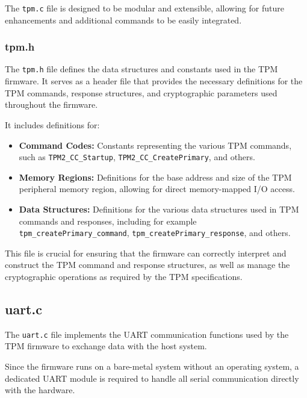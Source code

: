 The \texttt{tpm.c} file is designed to be modular and
extensible, allowing for future enhancements and
additional commands to be easily integrated.

\subsubsection{tpm.h}
The \texttt{tpm.h} file defines the data structures and
constants used in the TPM firmware. It serves as a
header file that provides the necessary definitions
for the TPM commands, response structures, and
cryptographic parameters used throughout the firmware.

It includes definitions for:
\begin{itemize}
    \item \textbf{Command Codes:} Constants representing 
    the various TPM commands, such as 
    \texttt{TPM2\_CC\_Startup}, 
    \texttt{TPM2\_CC\_CreatePrimary}, and others.
    \item \textbf{Memory Regions:} Definitions for the 
    base address and size of the TPM peripheral memory 
    region, allowing for direct memory-mapped I/O access.
    \item \textbf{Data Structures:} Definitions for the 
    various data structures used in TPM commands and 
    responses, including for example 
    \texttt{tpm\_createPrimary\_command}, 
    \texttt{tpm\_createPrimary\_response}, and others.
\end{itemize}

This file is crucial for ensuring that the firmware
can correctly interpret and construct the TPM command
and response structures, as well as manage the
cryptographic operations as required by the TPM specifications.


\subsection{uart.c}
The \texttt{uart.c} file implements the UART
communication functions used by the TPM firmware to 
exchange data with the host system. 

Since the firmware runs 
on a bare-metal system without an operating system, a dedicated 
UART module is required to handle all serial communication directly 
with the hardware. 

